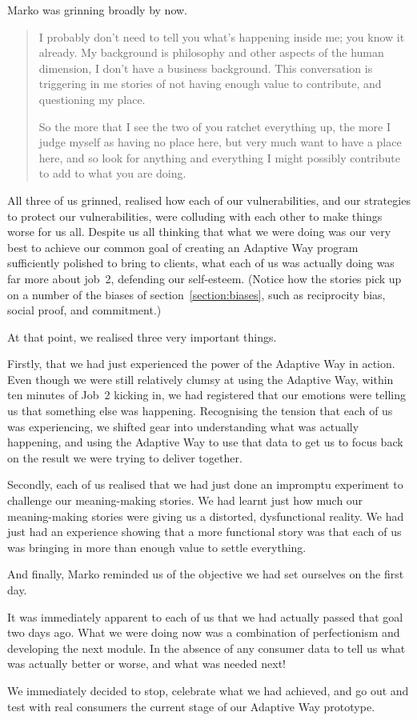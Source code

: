 \begin{longstoryblock}
Marko was grinning broadly by now. \begin{quote}I probably don't need to tell you what's happening inside me; you know it already. My background is philosophy and other aspects of the human dimension, I don't have a business background. This conversation is triggering in me stories of not having enough value to contribute, and questioning my place. 


So the more that I see the two of you ratchet everything up, the more I judge myself as having no place here, but very much want to have a place here, and so look for anything and everything I might possibly contribute to add to what you are doing.\end{quote}  


All three of us grinned, realised how each of our vulnerabilities, and our strategies to protect our vulnerabilities, were colluding with each other to make things worse for us all. Despite us all thinking that what we were doing was our very best to achieve our common goal of creating an Adaptive Way program sufficiently polished to bring to clients, what each of us was actually doing was far more about job~2, defending our self-esteem. (Notice how the stories pick up on a number of the biases of section~\ref{section:biases}, such as reciprocity bias, social proof, and commitment.)


At that point, we realised three very important things. 


Firstly, that we had just experienced the power of the Adaptive Way in action. Even though we were still relatively clumsy at using the Adaptive Way, within ten minutes of Job~2 kicking in, we had registered that our emotions were telling us that something else was happening. Recognising the tension that each of us was experiencing, we shifted gear into understanding what was actually happening, and using the Adaptive Way to use that data to get us to focus back on the result we were trying to deliver together.


Secondly, each of us realised that we had just done an impromptu experiment to challenge our meaning\hyp{}making stories. We had learnt just how much our meaning\hyp{}making stories were giving us a distorted, dysfunctional reality. We had just had an experience showing that a more functional story was that each of us was bringing in more than enough value to settle everything.


And finally, Marko reminded us of the objective we had set ourselves on the first day. 


It was immediately apparent to each of us that we had actually passed that goal two days ago. What we were doing now was a combination of perfectionism and developing the next module. In the absence of any consumer data to tell us what was actually better or worse, and what was needed next! 


We immediately decided to stop, celebrate what we had achieved, and go out and test with real consumers the current stage of our Adaptive Way prototype.
\end{longstoryblock}





